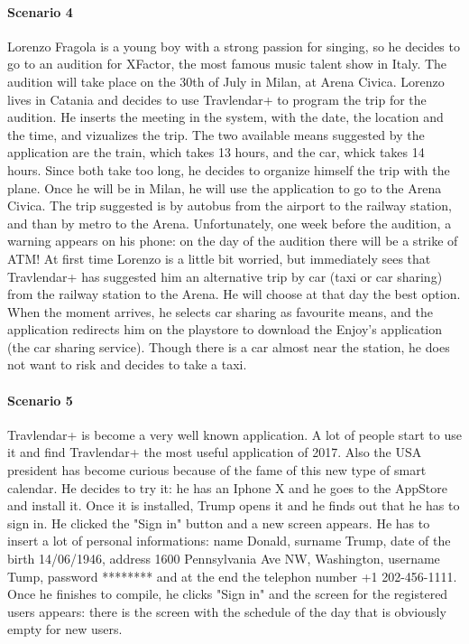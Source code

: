 \documentclass[12pt,titlepage]{article}
\begin{document}
\paragraph{Scenario 4}
Lorenzo Fragola is a young boy with a strong passion for singing, so he decides to go to an audition for XFactor, the most famous music talent show in Italy. The audition will take place on the 30th of July in Milan, at Arena Civica. Lorenzo lives in Catania and decides to use Travlendar+ to program the trip for the audition. He inserts the meeting in the system, with the date, the location and the time, and vizualizes the trip. The two available means suggested by the application are the train, which takes 13 hours, and the car, whick takes 14 hours. Since both take too long, he decides to organize himself the trip with the plane. Once he will be in Milan, he will use the application to go to the Arena Civica. The trip suggested is by autobus from the airport to the railway station, and than by metro to the Arena. Unfortunately, one week before the audition, a warning appears on his phone: on the day of the audition there will be a strike of ATM! At first time Lorenzo is a little bit worried, but immediately sees that Travlendar+ has suggested him an alternative trip by car (taxi or car sharing) from the railway station to the Arena. He will choose at that day the best option. When the moment arrives, he selects car sharing as favourite means, and the application redirects him on the playstore to download the Enjoy's application (the car sharing service). Though there is a car almost near the station, he does not want to risk and decides to take a taxi. 

\paragraph{Scenario 5}
Travlendar+ is become a very well known application. A lot of people start to use it and find Travlendar+ the most useful application of 2017. 
Also the USA president has become curious because of the fame of this new type of smart calendar. He decides to try it: he has an Iphone X and he goes to the AppStore and install it.
Once it is installed, Trump opens it and he finds out that he has to sign in. He clicked the "Sign in" button and a new screen appears. 
He has to insert a lot of personal informations: name Donald, surname Trump, date of the birth 14/06/1946, address 1600 Pennsylvania Ave NW, Washington, username Tump, password ******** and at the end the telephon number +1 202-456-1111.
Once he finishes to compile, he clicks "Sign in" and the screen for the registered users appears: there is the screen with the schedule of the day that is obviously empty for new users.
\end{document}

